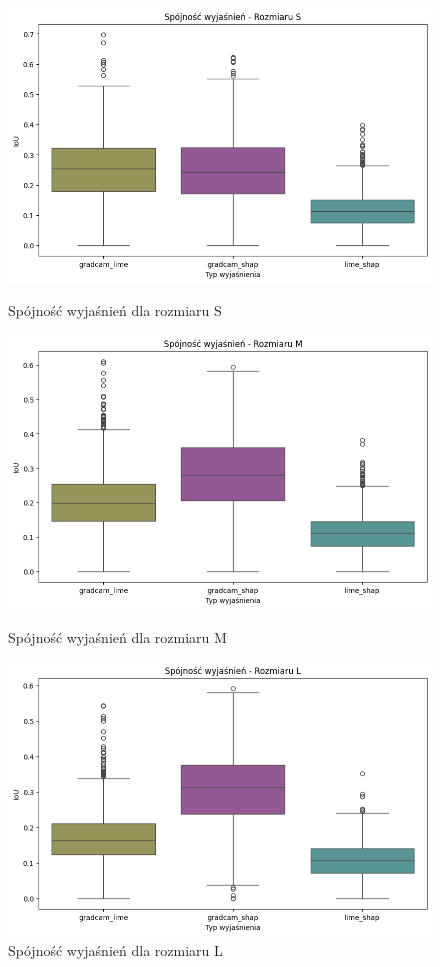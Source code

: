 \begin{figure}
	\centering
	\begin{minipage}[b]{0.3\textwidth}
		\includegraphics[width=.9\textwidth]{img/base_coherence_size_S}
		\caption{Spójność wyjaśnień dla rozmiaru S}  \label{}
	\end{minipage}
	\begin{minipage}[b]{0.3\textwidth}
		\centering\includegraphics[width=.9\textwidth]{img/base_coherence_size_M}
		\caption{Spójność wyjaśnień dla rozmiaru M}  \label{}
	\end{minipage}
	\begin{minipage}[b]{0.3\textwidth}
		\centering\includegraphics[width=.9\textwidth]{img/base_coherence_size_L}
		\caption{Spójność wyjaśnień dla rozmiaru L}  \label{}
	\end{minipage}
\end{figure}

